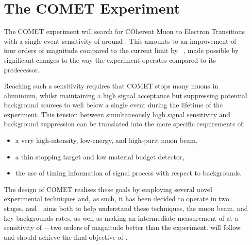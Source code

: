 

\chapter{The COMET Experiment}

The COMET experiment will search for COherent Muon to Electron Transitions with a single-event sensitivity of around \sensePII.
This amounts to an improvement of four orders of magnitude compared to the current limit by \sindrumII~\cite{sindrum2006}, made possible by significant changes to the way the experiment operates compared to its predecessor.

Reaching such a sensitivity requires that COMET stops many muons in aluminium, whilst maintaining a high signal acceptance but
suppressing potential background sources to well below a single event during the lifetime of the experiment.
This tension between simultaneously high signal sensitivity and background suppression can be translated into the more specific requirements of:
\begin{itemize}
\setlength{\itemsep}{-1ex}
\item a very high-intensity, low-energy, and high-purit muon beam,
\item a thin stopping target and low material budget detector,
\item the use of timing information of signal process with respect to backgrounds.
\end{itemize}

The design of COMET realises these goals by employing several novel experimental techniques and, as such, it has been decided to operate in two stages, \phaseI and \phaseII.
\phaseI aims both to help understand these techniques, the muon beam, and key backgrounds rates, as well as making an intermediate measurement of \mueconv at a sensitivity of \sensePI---two orders of magnitude better than the \sindrumII experiment.
\phaseII will follow and should achieve the final objective of \sensePII. 


